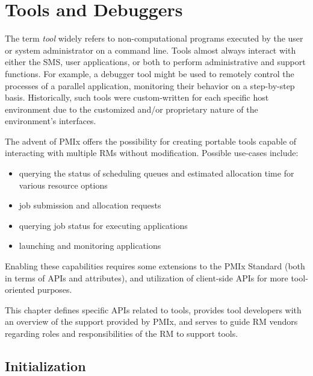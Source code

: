 \chapter{Tools and Debuggers}
\label{chap:api_tools}

The term \textit{tool} widely refers to non-computational programs executed by the user or system administrator on a command line. Tools almost always interact with either the \ac{SMS}, user applications, or both to perform administrative and support functions. For example, a debugger tool might be used to remotely control the processes of a parallel application, monitoring their behavior on a step-by-step basis. Historically, such tools were custom-written for each specific host environment due to the customized and/or proprietary nature of the environment's interfaces.

The advent of \ac{PMIx} offers the possibility for creating portable tools capable of interacting with multiple \acp{RM} without modification. Possible use-cases include:

\begin{itemize}
\item querying the status of scheduling queues and estimated allocation time for various resource options
\item job submission and allocation requests
\item querying job status for executing applications
\item launching and monitoring applications
\end{itemize}

Enabling these capabilities requires some extensions to the \ac{PMIx} Standard (both in terms of \acp{API} and attributes), and utilization of client-side \acp{API} for more tool-oriented purposes.

This chapter defines specific \acp{API} related to tools, provides tool developers with an overview of the support provided by \ac{PMIx}, and serves to guide \ac{RM} vendors regarding roles and responsibilities of the \ac{RM} to support tools.

\section{Initialization}
\label{chap:api_tools:init}


